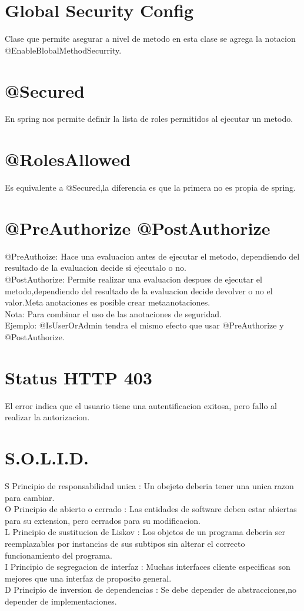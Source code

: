 \section{Global Security Config}
Clase que permite asegurar a nivel de metodo en esta clase se agrega la notacion @EnableBlobalMethodSecurrity.
\section{@Secured}
En spring nos permite definir la lista de roles permitidos al ejecutar un metodo.
\section{@RolesAllowed}
Es equivalente a @Secured,la diferencia es que la primera no es propia de spring.
\section{@PreAuthorize @PostAuthorize}
@PreAuthoize: Hace una evaluacion antes de ejecutar el metodo, dependiendo del resultado de la evaluacion decide si ejecutalo o no.\\
@PostAuthorize: Permite realizar una evaluacion despues de ejecutar el metodo,dependiendo del resultado de la evaluacion decide devolver o no el valor.Meta anotaciones es posible crear metaanotaciones.\\
Nota: Para combinar el uso de las anotaciones de seguridad.\\Ejemplo: @IsUserOrAdmin tendra el mismo efecto que usar 
@PreAuthorize y @PostAuthorize.
\section{Status HTTP 403}
El error indica que el usuario tiene una autentificacion exitosa, pero fallo al realizar la autorizacion.
\section{S.O.L.I.D.}
S Principio de responsabilidad unica : Un obejeto deberia tener una unica razon para cambiar. \\
O Principio de abierto o cerrado : Las entidades de software deben estar abiertas para su extension, pero cerrados para su modificacion.\\
L Principio de sustitucion de Liskov : Los objetos de un programa deberia ser reemplazables por instancias de sus subtipos
sin alterar el correcto funcionamiento del programa. \\
I Principio de segregacion de interfaz : Muchas interfaces cliente especificas son mejores que una interfaz de proposito general.\\
D Principio de inversion de dependencias : Se debe depender de abstracciones,no depender de implementaciones.
